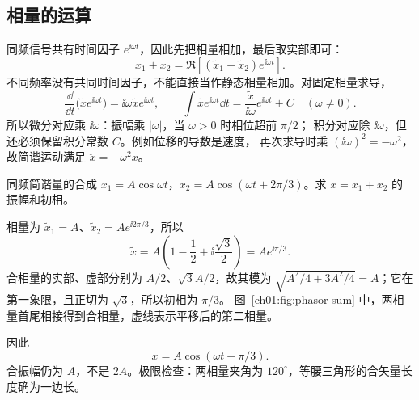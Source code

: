 \subsection{相量的运算}
同频信号共有时间因子 $e^{\ii\omega t}$，因此先把相量相加，最后取实部即可：
\[
 x_1+x_2=\Re\!\left[(\widetilde x_1+\widetilde x_2)e^{\ii\omega t}\right].
\]
不同频率没有共同时间因子，不能直接当作静态相量相加。对固定相量求导，
\[
 \frac{\dd}{\dd t}\bigl(\widetilde x e^{\ii\omega t}\bigr)
 =\ii\omega\widetilde x e^{\ii\omega t},\qquad
 \int\widetilde x e^{\ii\omega t}\dd t
 =\frac{\widetilde x}{\ii\omega}e^{\ii\omega t}+C\quad(\omega\ne0).
\]
所以微分对应乘 $\ii\omega$：振幅乘 $|\omega|$，当 $\omega>0$ 时相位超前 $\pi/2$；
积分对应除 $\ii\omega$，但还必须保留积分常数 $C$。例如位移的导数是速度，
再次求导时乘 $(\ii\omega)^2=-\omega^2$，故简谐运动满足 $\ddot x=-\omega^2x$。

\begin{origexamplebox}{同频简谐量的合成}
$x_1=A\cos\omega t$，$x_2=A\cos(\omega t+2\pi/3)$。求 $x=x_1+x_2$ 的振幅和初相。

\end{origexamplebox}
\begin{xesolution}
相量为 $\widetilde x_1=A$、$\widetilde x_2=Ae^{\ii2\pi/3}$，所以
\[
 \widetilde x=A\left(1-\frac12+\ii\frac{\sqrt3}{2}\right)
 =Ae^{\ii\pi/3}.
\]
合相量的实部、虚部分别为 $A/2$、$\sqrt3A/2$，故其模为
$\sqrt{A^2/4+3A^2/4}=A$；它在第一象限，且正切为 $\sqrt3$，所以初相为 $\pi/3$。
图~\ref{ch01:fig:phasor-sum} 中，两相量首尾相接得到合相量，虚线表示平移后的第二相量。
\begin{qualityfigure}
\label{ch01:fig:phasor-sum}
\end{qualityfigure}
因此
\[
 \boxed{x=A\cos(\omega t+\pi/3)}.
\]
合振幅仍为 $A$，不是 $2A$。极限检查：两相量夹角为 $120^\circ$，等腰三角形的合矢量长度确为一边长。
\end{xesolution}


